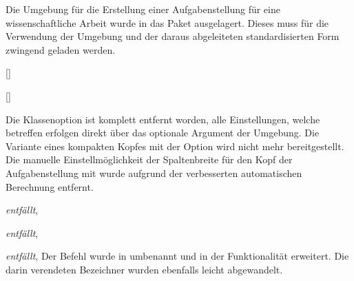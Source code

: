 \minisec{\taskname}
\begin{SubDeclaration}{}
Die Umgebung für die Erstellung einer Aufgabenstellung für eine 
wissenschaftliche Arbeit wurde in das Paket  
ausgelagert. Dieses muss für die Verwendung der Umgebung  
und der daraus abgeleiteten standardisierten Form zwingend geladen werden.

\begin{Declaration}[v2.00]{[\PSet]}
\begin{Declaration}[v2.00]{[\PBoolean]}
\begin{Declaration}[v2.00]{}
%
Die Klassenoption  ist komplett entfernt worden, alle 
Einstellungen, welche  betreffen erfolgen direkt über das 
optionale Argument der Umgebung. Die Variante eines kompakten Kopfes mit der 
Option  wird nicht mehr bereitgestellt. Die manuelle 
Einstellmöglichkeit der Spaltenbreite für den Kopf der Aufgabenstellung mit 
 wurde aufgrund der verbesserten automatischen Berechnung 
entfernt.
\end{Declaration}
\end{Declaration}
\end{Declaration}

\begin{Declaration}[v2.00]{%
}{\emph{entfällt}, }
\begin{Declaration}[v2.00]{}{%
  \emph{entfällt}, %
}
\begin{Declaration}[v2.00]{}{%
  \emph{entfällt}, %
}
\printdeclarationlist*%
%
Der Befehl  wurde in  umbenannt und in der 
Funktionalität erweitert. Die darin verendeten Bezeichner wurden ebenfalls 
leicht abgewandelt.
\end{Declaration}
\end{Declaration}
\end{Declaration}


\end{SubDeclaration}
